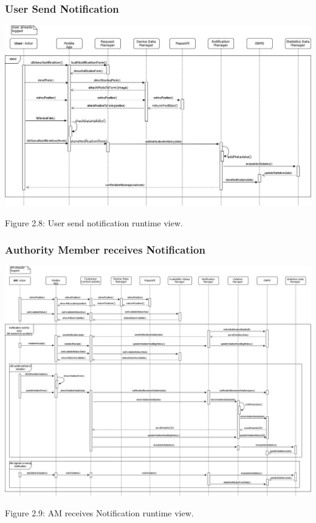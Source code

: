 \documentclass[12pt]{article}
\begin{document}
\subsubsection{User Send Notification}
\begin{center}
\includegraphics[scale=0.40]{SequenceDiagram/userSendNotification.jpg}


\vspace{2mm}
Figure 2.8: User send notification runtime view.
\end{center}
\newpage
\subsubsection{Authority Member receives Notification}
\begin{center}
\includegraphics[scale=0.30]{SequenceDiagram/authorityMemberReceiveNotification.jpg}


\vspace{2mm}
Figure 2.9: AM receives Notification runtime view.
\end{center}
\newpage
\end{document}
